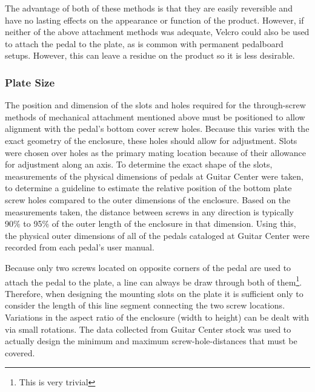 		The advantage of both of these methods is that they are easily reversible and have no lasting effects on the appearance or function of the product.  However, if neither of the above attachment methods was adequate, Velcro could also be used to attach the pedal to the plate, as is common with permanent pedalboard setups.  However, this can leave a residue on the product so it is less desirable.

		\subsubsection{Plate Size}

		The position and dimension of the slots and holes required for the through-screw methods of mechanical attachment mentioned above must be positioned to allow alignment with the pedal's bottom cover screw holes.  Because this varies with the exact geometry of the enclosure, these holes should allow for adjustment.  Slots were chosen over holes as the primary mating location because of their allowance for adjustment along an axis.  To determine the exact shape of the slots, measurements of the physical dimensions of pedals at Guitar Center were taken, to determine a guideline to estimate the relative position of the bottom plate screw holes compared to the outer dimensions of the enclosure.  Based on the measurements taken, the distance between screws in any direction is typically 90\% to 95\% of the outer length of the enclosure in that dimension.  Using this, the physical outer dimensions of all of the pedals cataloged at Guitar Center were recorded from each pedal's user manual.

		Because only two screws located on opposite corners of the pedal are used to attach the pedal to the plate, a line can always be draw through both of them\footnote{This is very trivial}.  Therefore, when designing the mounting slots on the plate it is sufficient only to consider the length of this line segment connecting the two screw locations.  Variations in the aspect ratio of the enclosure (width to height) can be dealt with via small rotations.  The data collected from Guitar Center stock was used to actually design the minimum and maximum screw-hole-distances that must be covered.

